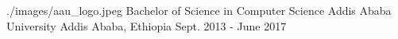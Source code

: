 

\begin{cventries}

  \cventrywithlogo
    {./images/aau_logo.jpeg} %
    {Bachelor of Science in Computer Science} %
    {Addis Ababa University} %
    {Addis Ababa, Ethiopia} %
    {Sept. 2013 - June 2017} %
    {}
    {}


\end{cventries}
